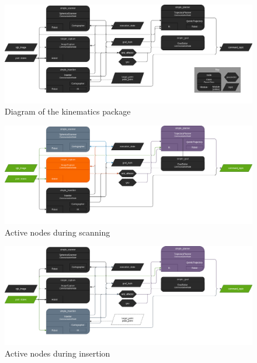 \begin{figure}[ht]
    \centering
    \includegraphics[width=\textwidth]{images/diagram.png}
    \caption{Diagram of the kinematics package}
    \label{app_overview}
\end{figure}
\newline

\begin{figure}[ht]
    \centering
    \includegraphics[width=\textwidth]{images/scanning.png}
    \caption{Active nodes during scanning}
    \label{app_2}
\end{figure}

\newpage


\begin{figure}[ht]
    \centering
    \includegraphics[width=\textwidth]{images/insertion.png}
    \caption{Active nodes during insertion}
    \label{app_3}
\end{figure}